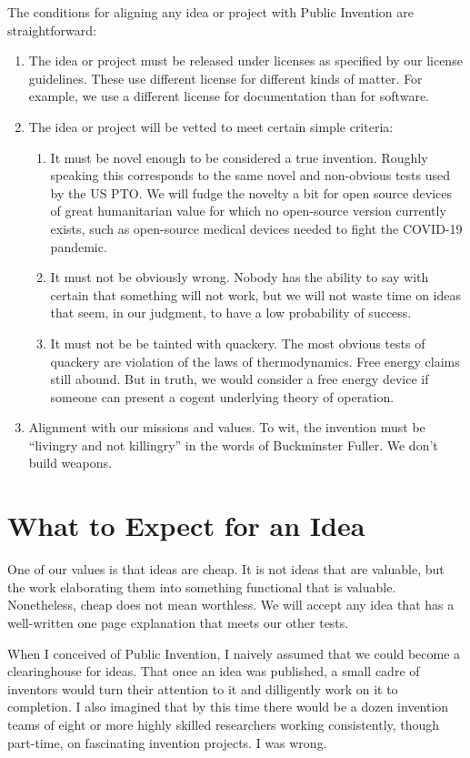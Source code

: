 \documentclass[
	fontsize=10pt, %
	twoside=false, %
	secnumdepth=1, %
]{kaobook}
\begin{document}
The conditions for aligning any idea or project with Public Invention are straightforward:
\begin{enumerate}
\item The idea or project must be released under licenses as specified by our license guidelines.
  These use different license for different kinds of matter. For example, we use a different license
  for documentation than for software.
\item The idea or project will be vetted to meet certain simple criteria:
  \begin{enumerate}
  \item It must be novel enough to be considered a true invention. Roughly speaking this corresponds to the same novel and non-obvious tests used by the US PTO.
    We will fudge the novelty a bit for open source devices of great humanitarian value for which no open-source version currently exists, such as open-source medical devices needed to fight the COVID-19 pandemic.
  \item It must not be obviously wrong. Nobody has the ability to say with certain that something will not work, but we will not waste time on ideas that seem,
    in our judgment, to have a low probability of success.
  \item
    It must not be be tainted with quackery. The most obvious tests of quackery are violation of the laws of thermodynamics. Free energy claims still abound.
    But in truth, we would consider a free energy device if someone can present a cogent underlying theory of operation.
  \end{enumerate}
  \item Alignment with our missions and values. To wit, the invention must be ``livingry and not killingry'' in the words of Buckminster Fuller. We don't build weapons.
\end{enumerate}

\section{What to Expect for an Idea}
One of our values is that ideas are cheap. It is not ideas that are valuable, but the work elaborating them into something functional that is valuable.
Nonetheless, cheap does not mean worthless. We will accept any idea that has a well-written one page explanation that meets our other tests.

When I conceived of Public Invention, I naively assumed that we could become a clearinghouse for ideas.
That once an idea was published, a small cadre of inventors would turn their attention to it and dilligently work on it to completion.
I also imagined that by this time there would be a dozen invention teams of eight or more highly skilled researchers working consistently, though part-time,
on fascinating invention projects. I was wrong.
\end{document}
